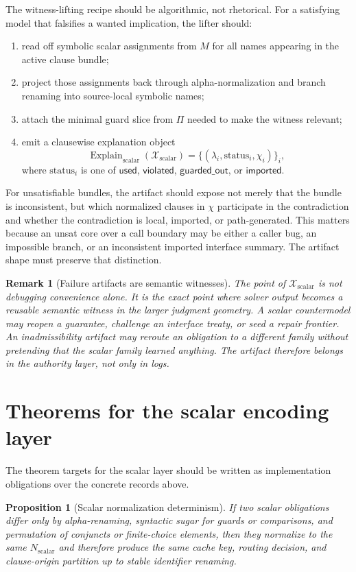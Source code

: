 \documentclass[11pt]{report}
\newtheorem{proposition}[definition]{Proposition}
\newtheorem{remark}[definition]{Remark}
\begin{document}
The witness-lifting recipe should be algorithmic, not rhetorical. For a satisfying model that falsifies a wanted implication, the lifter should:
\begin{enumerate}
\item read off symbolic scalar assignments from $M$ for all names appearing in the active clause bundle;
\item project those assignments back through alpha-normalization and branch renaming into source-local symbolic names;
\item attach the minimal guard slice from $\Pi$ needed to make the witness relevant;
\item emit a clausewise explanation object
\[
\operatorname{Explain}_{\mathrm{scalar}}(\mathcal{X}_{\mathrm{scalar}})
=
\{(\lambda_i,\mathrm{status}_i,\chi_i)\}_i,
\]
where $\mathrm{status}_i$ is one of $\mathsf{used}$, $\mathsf{violated}$, $\mathsf{guarded\_out}$, or $\mathsf{imported}$.
\end{enumerate}

For unsatisfiable bundles, the artifact should expose not merely that the bundle is inconsistent, but which normalized clauses in $\chi$ participate in the contradiction and whether the contradiction is local, imported, or path-generated. This matters because an unsat core over a call boundary may be either a caller bug, an impossible branch, or an inconsistent imported interface summary. The artifact shape must preserve that distinction.

\begin{remark}[Failure artifacts are semantic witnesses]
The point of $\mathcal{X}_{\mathrm{scalar}}$ is not debugging convenience alone. It is the exact point where solver output becomes a reusable semantic witness in the larger judgment geometry. A scalar countermodel may reopen a guarantee, challenge an interface treaty, or seed a repair frontier. An inadmissibility artifact may reroute an obligation to a different family without pretending that the scalar family learned anything. The artifact therefore belongs in the authority layer, not only in logs.
\end{remark}
\section{Theorems for the scalar encoding layer}
The theorem targets for the scalar layer should be written as implementation obligations over the concrete records above.

\begin{proposition}[Scalar normalization determinism]
If two scalar obligations differ only by alpha-renaming, syntactic sugar for guards or comparisons, and permutation of conjuncts or finite-choice elements, then they normalize to the same $N_{\mathrm{scalar}}$ and therefore produce the same cache key, routing decision, and clause-origin partition up to stable identifier renaming.
\end{proposition}
\end{document}
